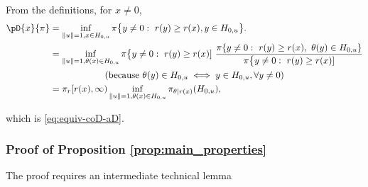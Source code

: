 \documentclass{article}
\numberwithin{equation}{section}
\renewcommand{\P}{\mathbb{P}}
\newcommand{\AHS}[1]{H_{0, {#1}} }
\newcommand{\coD}[2]{\pD{#1}{#2}}
\begin{document}
From the definitions, %
for $x\neq 0$, 
\begin{align*}
    \coD{x}{\pi}
    & = \inf_{\| u \| = 1 , x \in \AHS{u} }\pi\big\{y\neq 0:~  r(y) \ge  r(x), y \in
    \AHS{u}\big\}.                                                             \\
    & = \inf_{\| u \| = 1 , \theta(x) \in\AHS{u} }\pi\big\{ y\neq 0: ~r(y) \ge  r(x) ]~
    \frac{\pi\{y\neq0:  ~r(y) \ge  r(x), ~ \theta(y) \in \AHS{u} \}}{\pi\big\{ y\neq 0: ~r(y) \ge  r(x) ]} %
    \\
    & \qquad \qquad \qquad (\text{because } \theta(y) \in \AHS{u}
    \iff y \in  \AHS{u}, \forall y\neq 0 )                                \\
    & = \pi_r[r(x),\infty)  \inf_{\| u \| = 1 , \theta(x) \in \AHS{u}
    }\pi_{\theta|r(x)}(\AHS{u}),
\end{align*}

which is \eqref{eq:equiv-coD-aD}.


\subsubsection{Proof of Proposition \ref{prop:main_properties}}
%
The proof requires an intermediate technical lemma
\end{document}
